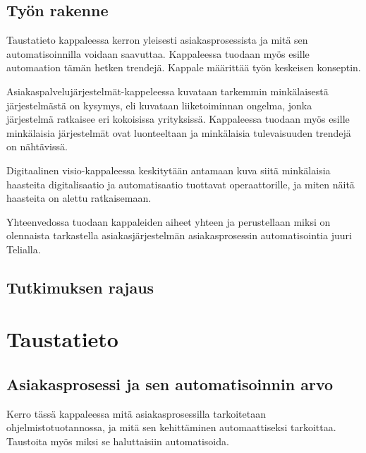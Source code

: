 \documentclass[finnish,12pt,a4paper,pdftex]{article}
\begin{document}
\subsection{Työn rakenne}
Taustatieto kappaleessa kerron yleisesti asiakasprosessista ja mitä sen automatisoinnilla voidaan saavuttaa. Kappaleessa tuodaan myös esille automaation tämän hetken trendejä. Kappale määrittää työn keskeisen konseptin.

Asiakaspalvelujärjestelmät-kappeleessa kuvataan tarkemmin minkälaisestä järjestelmästä on kysymys, eli kuvataan liiketoiminnan ongelma, jonka järjestelmä ratkaisee eri kokoisissa yrityksissä. Kappaleessa tuodaan myös esille minkälaisia järjestelmät ovat luonteeltaan ja minkälaisia tulevaisuuden trendejä on nähtävissä.

Digitaalinen visio-kappaleessa keskitytään antamaan kuva siitä minkälaisia haasteita digitalisaatio ja automatisaatio tuottavat operaattorille, ja miten näitä haasteita on alettu ratkaisemaan.

Yhteenvedossa tuodaan kappaleiden aiheet yhteen ja perustellaan miksi on olennaista tarkastella asiakasjärjestelmän asiakasprosessin automatisointia juuri Telialla.

\subsection{Tutkimuksen rajaus}


\clearpage

\section{Taustatieto}



\subsection{Asiakasprosessi ja sen automatisoinnin arvo}
Kerro tässä kappaleessa mitä asiakasprosessilla tarkoitetaan ohjelmistotuotannossa, ja mitä sen kehittäminen automaattiseksi tarkoittaa. Taustoita myös miksi se haluttaisiin automatisoida.
\end{document}
